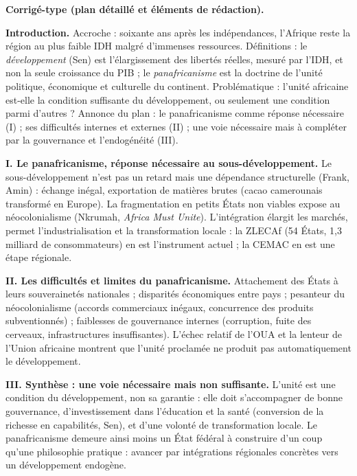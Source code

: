 \documentclass[11pt]{article}
\begin{document}
\begin{corrige}
\textbf{Corrigé-type (plan détaillé et éléments de rédaction).}

\textbf{Introduction.} Accroche : soixante ans après les indépendances, l'Afrique reste la région au plus faible IDH malgré d'immenses ressources. Définitions : le \emph{développement} (Sen) est l'élargissement des libertés réelles, mesuré par l'IDH, et non la seule croissance du PIB ; le \emph{panafricanisme} est la doctrine de l'unité politique, économique et culturelle du continent. Problématique : l'unité africaine est-elle la condition suffisante du développement, ou seulement une condition parmi d'autres ? Annonce du plan : le panafricanisme comme réponse nécessaire (I) ; ses difficultés internes et externes (II) ; une voie nécessaire mais à compléter par la gouvernance et l'endogénéité (III).

\textbf{I. Le panafricanisme, réponse nécessaire au sous-développement.} Le sous-développement n'est pas un retard mais une dépendance structurelle (Frank, Amin) : échange inégal, exportation de matières brutes (cacao camerounais transformé en Europe). La fragmentation en petits États non viables expose au néocolonialisme (Nkrumah, \emph{Africa Must Unite}). L'intégration élargit les marchés, permet l'industrialisation et la transformation locale : la ZLECAf (54 États, 1,3 milliard de consommateurs) en est l'instrument actuel ; la CEMAC en est une étape régionale.

\textbf{II. Les difficultés et limites du panafricanisme.} Attachement des États à leurs souverainetés nationales ; disparités économiques entre pays ; pesanteur du néocolonialisme (accords commerciaux inégaux, concurrence des produits subventionnés) ; faiblesses de gouvernance internes (corruption, fuite des cerveaux, infrastructures insuffisantes). L'échec relatif de l'OUA et la lenteur de l'Union africaine montrent que l'unité proclamée ne produit pas automatiquement le développement.

\textbf{III. Synthèse : une voie nécessaire mais non suffisante.} L'unité est une condition du développement, non sa garantie : elle doit s'accompagner de bonne gouvernance, d'investissement dans l'éducation et la santé (conversion de la richesse en capabilités, Sen), et d'une volonté de transformation locale. Le panafricanisme demeure ainsi moins un État fédéral à construire d'un coup qu'une philosophie pratique : avancer par intégrations régionales concrètes vers un développement endogène.


\end{corrige}
\end{document}
